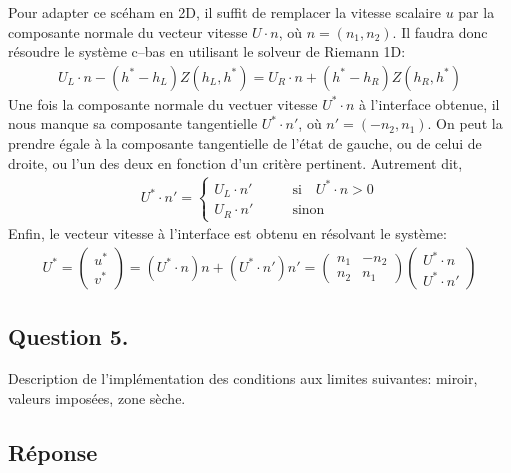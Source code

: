 \documentclass[
	french,
	11pt, %
]{fphw}
\begin{document}
Pour adapter ce scéham en 2D, il suffit de remplacer la vitesse scalaire $u$ par la composante normale du vecteur vitesse $U \cdot n$, où $n=(n_1, n_2)$. Il faudra donc résoudre le système c--bas en utilisant le solveur de Riemann 1D:
\begin{align*}
	U_L \cdot n - (h^* - h_L)Z(h_L, h^*) = U_R \cdot n + (h^* - h_R)Z(h_R, h^*)
\end{align*}
Une fois la composante normale du vectuer vitesse $U^* \cdot n$ à l'interface obtenue, il nous manque sa composante tangentielle $U^* \cdot n'$, où $n' = (-n_2, n_1)$. On peut la prendre égale à la composante tangentielle de l'état de gauche, ou de celui de droite, ou l'un des deux en fonction d'un critère pertinent. Autrement dit, 
\begin{align*}
	U^* \cdot n' = 
	\begin{cases}
		U_L \cdot n' &\qquad \text{si} \quad  U^* \cdot n > 0\\
		U_R \cdot n' &\qquad \text{sinon}
	\end{cases}
\end{align*}
Enfin, le vecteur vitesse à l'interface est obtenu en résolvant le système:
\begin{align*}
	U^* = 
	\begin{pmatrix} u^* \\ v^* \end{pmatrix}
	= (U^* \cdot n)n + (U^* \cdot n')n'
	= \begin{pmatrix} n_1 & -n_2 \\ n_2 & n_1 \end{pmatrix}
	\begin{pmatrix} U^* \cdot n \\ U^* \cdot n' \end{pmatrix}
\end{align*}



\subsection*{Question 5.}

\begin{problem}
	Description de l’implémentation des conditions aux limites suivantes: miroir, valeurs imposées, zone sèche.
\end{problem}

\subsection*{Réponse} 
\end{document}
